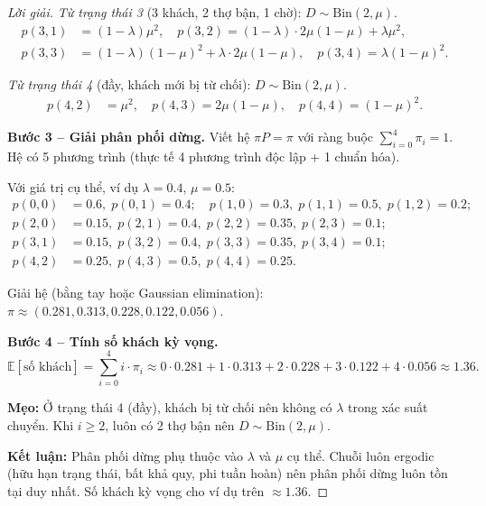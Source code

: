 \documentclass[8pt,a4paper]{article}
\newenvironment{solution}{\begin{proof}[Lời giải]}{\end{proof}}
\newcommand{\E}{\mathbb{E}}
\begin{document}
\begin{solution}
\textit{Từ trạng thái 3} (3 khách, 2 thợ bận, 1 chờ): $D \sim \text{Bin}(2, \mu)$.
\begin{align*}
  p(3, 1) &= (1-\lambda)\mu^2, \quad
  p(3, 2) = (1-\lambda) \cdot 2\mu(1-\mu) + \lambda\mu^2, \\
  p(3, 3) &= (1-\lambda)(1-\mu)^2 + \lambda \cdot 2\mu(1-\mu), \quad
  p(3, 4) = \lambda(1-\mu)^2.
\end{align*}

\textit{Từ trạng thái 4} (đầy, khách mới bị từ chối): $D \sim \text{Bin}(2, \mu)$.
\begin{align*}
  p(4, 2) &= \mu^2, \quad p(4, 3) = 2\mu(1-\mu), \quad p(4, 4) = (1-\mu)^2.
\end{align*}

\textbf{Bước 3 -- Giải phân phối dừng.}
Viết hệ $\pi P = \pi$ với ràng buộc $\sum_{i=0}^{4} \pi_i = 1$. Hệ có 5 phương trình (thực tế 4 phương trình độc lập + 1 chuẩn hóa).

Với giá trị cụ thể, ví dụ $\lambda = 0.4$, $\mu = 0.5$:
\begin{align*}
  p(0,0)&=0.6,\; p(0,1)=0.4; \quad p(1,0)=0.3,\; p(1,1)=0.5,\; p(1,2)=0.2; \\
  p(2,0)&=0.15,\; p(2,1)=0.4,\; p(2,2)=0.35,\; p(2,3)=0.1; \\
  p(3,1)&=0.15,\; p(3,2)=0.4,\; p(3,3)=0.35,\; p(3,4)=0.1; \\
  p(4,2)&=0.25,\; p(4,3)=0.5,\; p(4,4)=0.25.
\end{align*}

Giải hệ (bằng tay hoặc Gaussian elimination):
$\pi \approx (0.281, 0.313, 0.228, 0.122, 0.056)$.

\textbf{Bước 4 -- Tính số khách kỳ vọng.}
\[
  \E[\text{số khách}] = \sum_{i=0}^{4} i \cdot \pi_i \approx 0 \cdot 0.281 + 1 \cdot 0.313 + 2 \cdot 0.228 + 3 \cdot 0.122 + 4 \cdot 0.056 \approx 1.36.
\]

\textbf{Mẹo:} Ở trạng thái 4 (đầy), khách bị từ chối nên không có $\lambda$ trong xác suất chuyển. Khi $i \geq 2$, luôn có 2 thợ bận nên $D \sim \text{Bin}(2,\mu)$.

\textbf{Kết luận:} Phân phối dừng phụ thuộc vào $\lambda$ và $\mu$ cụ thể. Chuỗi luôn ergodic (hữu hạn trạng thái, bất khả quy, phi tuần hoàn) nên phân phối dừng luôn tồn tại duy nhất. Số khách kỳ vọng cho ví dụ trên $\approx 1.36$.
\end{solution}
\end{document}
